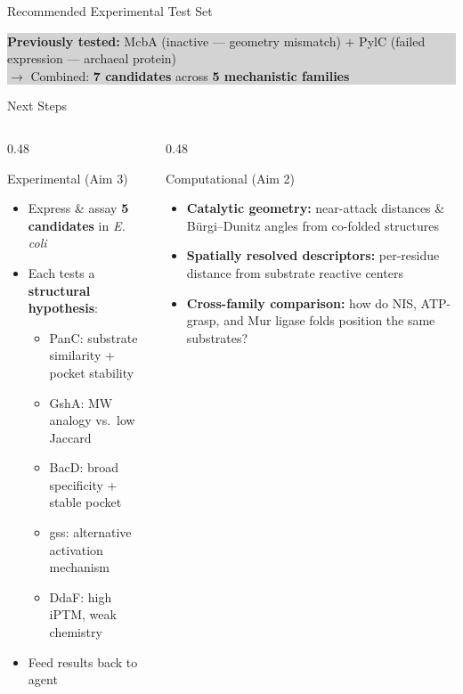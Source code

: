 \documentclass[aspectratio=169, 11pt]{beamer}
\begin{document}
\begin{frame}{Recommended Experimental Test Set}
\vspace{4pt}
\colorbox{lightgray}{\parbox{0.94\textwidth}{\centering\small
\textbf{Previously tested:} McbA (inactive --- geometry mismatch) + PylC (failed expression --- archaeal protein)\\
$\rightarrow$ Combined: \textbf{7 candidates} across \textbf{5 mechanistic families}
}}
\end{frame}

\begin{frame}{Next Steps}
\vspace{-4pt}
\begin{columns}[T]
\begin{column}{0.48\textwidth}
\begin{block}{Experimental (Aim 3)}
\begin{itemize}
\item Express \& assay \textbf{5 candidates} in \textit{E. coli}
\item Each tests a \textbf{structural hypothesis}:
  \begin{itemize}\small
  \item PanC: substrate similarity + pocket stability
  \item GshA: MW analogy vs.\ low Jaccard
  \item BacD: broad specificity + stable pocket
  \item gss: alternative activation mechanism
  \item DdaF: high iPTM, weak chemistry
  \end{itemize}
\item Feed results back to agent
\end{itemize}
\end{block}
\end{column}

\begin{column}{0.48\textwidth}
\begin{exampleblock}{Computational (Aim 2)}
\begin{itemize}
\item \textbf{Catalytic geometry:} near-attack distances \& B\"urgi--Dunitz angles from co-folded structures
\item \textbf{Spatially resolved descriptors:} per-residue distance from substrate reactive centers
\item \textbf{Cross-family comparison:} how do NIS, ATP-grasp, and Mur ligase folds position the same substrates?
\end{itemize}
\end{exampleblock}
\end{column}
\end{columns}


\end{frame}
\end{document}
